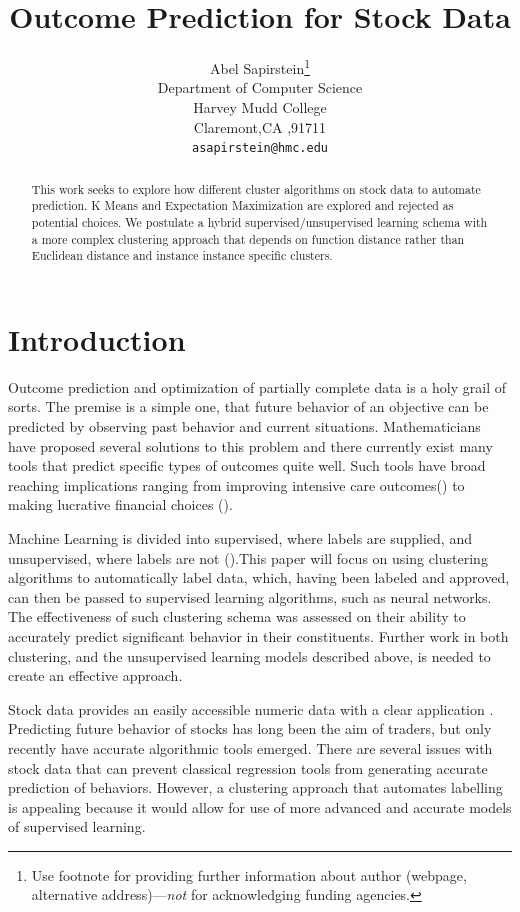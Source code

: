 \documentclass{article}
\title{Outcome Prediction for Stock Data}
\author{
  Abel Sapirstein\thanks{Use footnote for providing further
    information about author (webpage, alternative
    address)---\emph{not} for acknowledging funding agencies.} \\
  Department of Computer Science\\
  Harvey Mudd College\\
  Claremont,CA ,91711 \\
  \texttt{asapirstein@hmc.edu} 
}
\begin{document}

\maketitle

\begin{abstract}
This work seeks to explore how different cluster algorithms on stock data to automate prediction. K Means and Expectation Maximization are explored and rejected as potential choices. We postulate a hybrid supervised/unsupervised learning schema with a more complex clustering approach that depends on function distance rather than Euclidean distance and instance instance specific clusters.  
\end{abstract}

\section{Introduction}

Outcome prediction and optimization  of partially complete data is a holy grail of sorts. The premise is a simple one, that future behavior of an objective  can be predicted by observing past behavior and current situations. Mathematicians have proposed several solutions to this problem and there currently exist many tools that predict specific types of outcomes quite well. Such tools have broad reaching implications ranging from improving intensive care outcomes(\cite{meiring}) to making lucrative financial choices (\cite{gerlein}). 

Machine Learning is divided into supervised, where labels are supplied, and unsupervised, where labels are not (\cite{murphy}).This paper will focus on using clustering algorithms to automatically label data, which, having been labeled and approved, can then be passed to supervised learning algorithms, such as neural networks. The effectiveness of such clustering schema was assessed on their ability to accurately predict significant behavior in their constituents. Further work in both clustering, and the unsupervised learning models described above, is needed to create an effective approach. 

Stock data provides an easily accessible numeric data with a clear application . Predicting future behavior of stocks has long been the aim of traders, but only recently have accurate algorithmic tools emerged. There are several issues with stock data that can prevent classical regression tools from generating accurate prediction of behaviors. However, a clustering approach that automates labelling is appealing because it would allow for use of more advanced and accurate models of supervised learning. 
\end{document}
